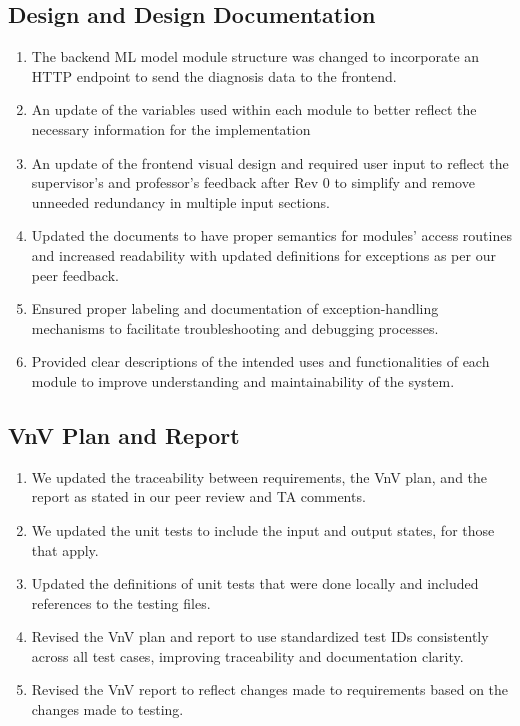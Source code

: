 \documentclass{article}
\begin{document}
\subsection{Design and Design Documentation}

\begin{enumerate}
    \item The backend ML model module structure was changed to incorporate an HTTP endpoint to send the diagnosis data to the frontend.
    \item An update of the variables used within each module to better reflect the necessary information for the implementation
    \item An update of the frontend visual design and required user input to reflect the supervisor's and professor's feedback after Rev 0 to simplify and remove unneeded redundancy in multiple input sections. 
    \item Updated the documents to have proper semantics for modules' access routines and increased readability with updated definitions for exceptions as per our peer feedback.
    \item Ensured proper labeling and documentation of exception-handling mechanisms to facilitate troubleshooting and debugging processes.
    \item Provided clear descriptions of the intended uses and functionalities of each module to improve understanding and maintainability of the system.
  
\end{enumerate}

\subsection{VnV Plan and Report}

\begin{enumerate}
    \item  We updated the traceability between requirements, the VnV plan, and the report as stated in our peer review and TA comments. 
    \item We updated the unit tests to include the input and output states, for those that apply.
    \item Updated the definitions of unit tests that were done locally and included references to the testing files.
    \item Revised the VnV plan and report to use standardized test IDs consistently across all test cases, improving traceability and documentation clarity.
    \item Revised the VnV report to reflect changes made to requirements based on the changes made to testing.
\end{enumerate}
\end{document}

